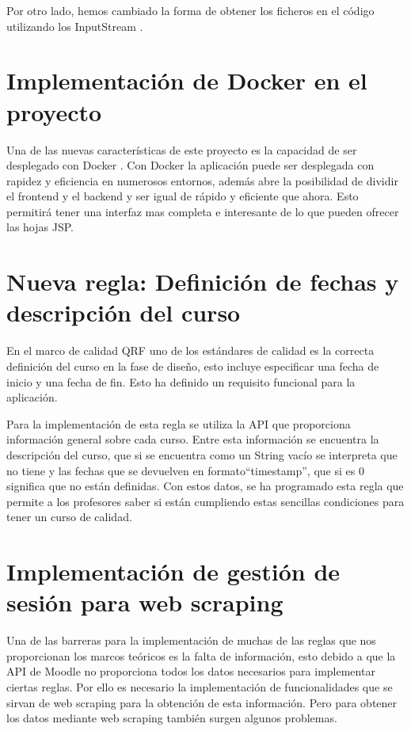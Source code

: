 Por otro lado, hemos cambiado la forma de obtener los ficheros en el código utilizando los InputStream \cite{inputstream}.

\section{Implementación de Docker en el proyecto}
Una de las nuevas características de este proyecto es la capacidad de  ser desplegado con Docker \cite{docker}. Con Docker la aplicación puede ser desplegada con rapidez y eficiencia en numerosos entornos, además abre la posibilidad de dividir el frontend y el backend y ser igual de rápido y eficiente que ahora. Esto permitirá tener una interfaz mas completa e interesante de lo que pueden ofrecer las hojas JSP.

\section{Nueva regla: Definición de fechas y descripción del curso}
En el marco de calidad QRF \cite{quality-reference-framework} uno de los estándares de calidad es la correcta definición del curso en la fase de diseño, esto incluye especificar una fecha de inicio y una fecha de fin. Esto ha definido un requisito funcional para la aplicación.

Para la implementación de esta regla se utiliza la API que proporciona información general sobre cada curso. Entre esta información se encuentra la descripción del curso, que si se encuentra como un String vacío se interpreta que no tiene y las fechas que se devuelven en formato``timestamp'', que si es 0 significa que no están definidas. Con estos datos, se ha programado esta regla que permite a los profesores saber si están cumpliendo estas sencillas condiciones para tener un curso de calidad.

\section{Implementación de gestión de sesión para web scraping}
Una de las barreras para la implementación de muchas de las reglas que nos proporcionan los marcos teóricos es la falta de información, esto debido a que la API de Moodle \cite{moodle-api} no proporciona todos los datos necesarios para implementar ciertas reglas. Por ello es necesario la implementación de funcionalidades que se sirvan de web scraping para la obtención de esta información. Pero para obtener los datos mediante web scraping también surgen algunos problemas.

